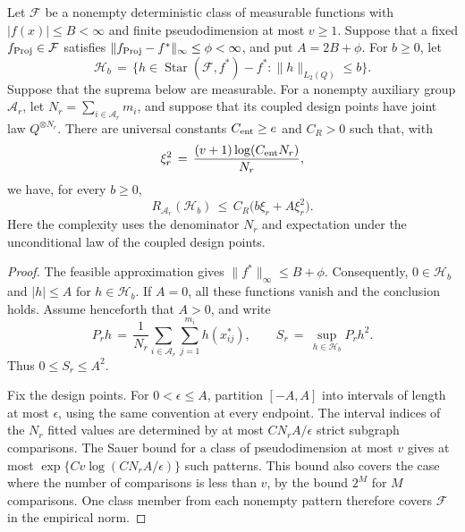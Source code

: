 \documentclass[twoside,11pt]{article}
\newenvironment{revision}{\color{revisionred}}{}
\begin{document}
\begin{revision}
\begin{lemma}
\label{lem_nn_expected_local_width}
Let $\mathcal F$ be a nonempty deterministic class of measurable functions
with $|f(x)|\le B<\infty$ and finite pseudodimension at most $v\ge1$.
Suppose that a fixed $f_{\rm Proj}\in\mathcal F$ satisfies
$\|f_{\rm Proj}-f^*\|_\infty\le\phi<\infty$, and put $A=2B+\phi$.
For $b\ge0$, let
\[
\mathcal H_b
\,=\,
\{h\in\operatorname{Star}(\mathcal F,f^*)-f^*:
  \|h\|_{L_2(Q)}\le b\}.
\]
Suppose that the suprema below are measurable.
For a nonempty auxiliary group $\mathcal A_r$, let
$N_r=\sum_{i\in\mathcal A_r}m_i$, and suppose that its coupled design
points have joint law $Q^{\otimes N_r}$.
There are universal constants $C_{\rm ent}\ge e$ and $C_R>0$ such that,
with
\begin{equation}
\label{eq_nn_width_scale}
\xi_r^2
\,=\,
\frac{(v+1)\log(C_{\rm ent}N_r)}{N_r},
\end{equation}
we have, for every $b\ge0$,
\begin{equation}
\label{eq_nn_expected_local_width}
R_{\mathcal A_r}(\mathcal H_b)
\,\le\,
C_R\bigl(b\xi_r+A\xi_r^2\bigr).
\end{equation}
Here the complexity uses the denominator $N_r$ and expectation under
the unconditional law of the coupled design points.
\end{lemma}

\begin{proof}
The feasible approximation gives
$\|f^*\|_\infty\le B+\phi$.
Consequently, $0\in\mathcal H_b$ and $|h|\le A$ for
$h\in\mathcal H_b$.
If $A=0$, all these functions vanish and the conclusion holds.
Assume henceforth that $A>0$, and write
\[
P_r h
\,=\,
\frac1{N_r}\sum_{i\in\mathcal A_r}\sum_{j=1}^{m_i}h(x_{ij}^*),
\qquad
S_r
\,=\,
\sup_{h\in\mathcal H_b}P_rh^2.
\]
Thus $0\le S_r\le A^2$.

Fix the design points. For $0<\epsilon\le A$, partition
$[-A,A]$ into intervals of length at most $\epsilon$,
using the same convention at every endpoint.
The interval indices of the $N_r$ fitted values are determined by
at most $C N_r A/\epsilon$ strict subgraph comparisons.
The Sauer bound for a class of pseudodimension at most $v$ gives
at most $\exp\{Cv\log(CN_rA/\epsilon)\}$ such patterns.
This bound also covers the case where the number of comparisons is
less than $v$, by the bound $2^M$ for $M$ comparisons.
One class member from each nonempty pattern therefore covers
$\mathcal F$ in the empirical norm.


\end{proof}
\end{revision}
\end{document}
